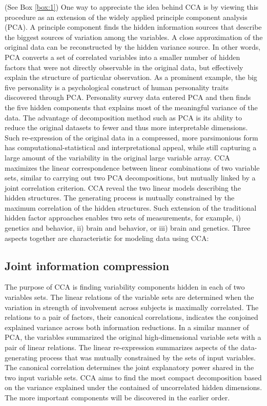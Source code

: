 (See Box \ref{box:1}) One way to appreciate the idea behind CCA is by viewing this procedure as an extension of the widely applied principle component analysis (PCA). A principle component finds the hidden information sources that describe the biggest sources of variation among the variables. A close approximation of the original data can be reconstructed by the hidden variance source. In other words, PCA converts a set of correlated variables into a smaller number of hidden factors that were not directly observable in the original data, but effectively explain the structure of particular observation. As a prominent example, the big five personality is a psychological construct of human personality traits discovered through PCA. Personality survey data entered PCA and then finds the five hidden components that explains most of the meaningful variance of the data. The advantage of decomposition method such as PCA is its ability to reduce the original datasets to fewer and thus more interpretable dimensions. Such re-expression of the original data in a compressed, more parsimonious form has computational-statistical and interpretational appeal, while still capturing a large amount of the variability in the original large variable array. CCA maximizes the linear correspondence between linear combinations of two variable sets, similar to carrying out two PCA decompositions, but mutually linked by a joint correlation criterion. CCA reveal the two linear models describing the hidden structures. The generating process is mutually constrained by the maximum correlation of the hidden structures. Such extension of the traditional hidden factor approaches enables two sets of measurements, for example, i) genetics and behavior, ii) brain and behavior, or iii) brain and genetics. Three aspects together are characteristic for modeling data using CCA:

\subsection{Joint information compression}
The purpose of CCA is finding variability components hidden in each of two variables sets.  The linear relations of the variable sets are determined when the variation in strength of involvement across subjects is maximally correlated. The relations to a pair of factors, their canonical correlations, indicates the conjoined explained variance across both information reductions. In a similar manner of PCA, the variables summarized the original high-dimensional variable sets with a pair of linear relations. The linear re-expression summarizes aspects of the data-generating process that was mutually constrained by the sets of input variables. The canonical correlation determines the joint explanatory power shared in the two input variable sets. CCA aims to find the most compact decomposition based on the variance explained under the contained of uncorrelated hidden dimensions. The more important components will be discovered in the earlier order.

